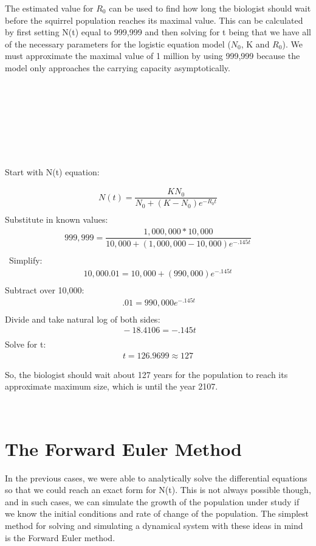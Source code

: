 \documentclass[12pt]{article}
\begin{document}
The estimated value for $R_0$ can be used to find how long the biologist should wait before the squirrel population reaches its maximal value. This can be calculated by first setting N(t) equal to 999,999 and then solving for t being that we have all of the necessary parameters for the logistic equation model ($N_0$, K and $R_0$). We must approximate the maximal value of 1 million by using 999,999 because the model only approaches the carrying capacity asymptotically.\\\\\\\\\\\\\\\
\begin{flushleft}
Start with N(t) equation:
\end{flushleft}
\begin{gather*}
N(t) = \dfrac{KN_0}{N_0+(K-N_0)e^{-R_0t}} \\
\end{gather*}
Substitute in known values:
\begin{gather*}
999,999 = \dfrac{1,000,000*10,000}{10,000+(1,000,000-10,000)e^{-.145t}} \\
\end{gather*}\
Simplify:	
\begin{gather*}
10,000.01 = 10,000+(990,000)e^{-.145t} \\
\end{gather*}
Subtract over 10,000:		
\begin{gather*}\
.01 = 990,000e^{-.145t} \\
\end{gather*}
Divide and take natural log of both sides:	
\begin{gather*}\
-18.4106 = -.145t \\
\end{gather*}
Solve for t:	
\begin{gather*}
t = 126.9699 \approx 127 
\end{gather*}

\begin{center}
So, the biologist should wait about 127 years for the population to reach its approximate maximum size, which is until the year 2107.
\end{center}\

\section{The Forward Euler Method}
In the previous cases, we were able to analytically solve the differential equations so that we could reach an exact form for N(t). This is not always possible though, and in such cases, we can simulate the growth of the population under study if we know the initial conditions and rate of change of the population.  The simplest method for solving and simulating a dynamical system with these ideas in mind is the Forward Euler method.
\end{document}
